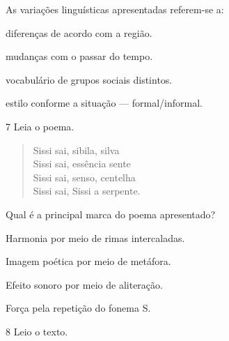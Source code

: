 As variações linguísticas apresentadas referem-se a:

\begin{escolha}
\item diferenças de acordo com a região.

\item mudanças com o passar do tempo.

\item vocabulário de grupos sociais distintos.

\item estilo conforme a situação --- formal/informal.
\end{escolha}


\num{7} Leia o poema.

\begin{myquote}
\begin{verse}
Sissi sai, sibila, silva\\
Sissi sai, essência sente\\
Sissi sai, senso, centelha\\
Sissi sai, Sissi a serpente.

\end{verse}
\end{myquote}

Qual é a principal marca do poema apresentado?

\begin{escolha}
\item Harmonia por meio de rimas intercaladas.

\item Imagem poética por meio de metáfora.

\item Efeito sonoro por meio de aliteração.

\item Força pela repetição do fonema S.
\end{escolha}


\num{8} Leio o texto.

